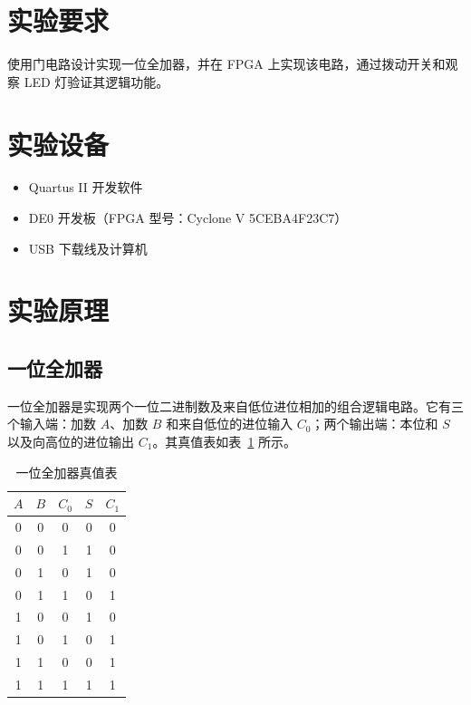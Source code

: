\documentclass{ctexrep}
\begin{document}
\section{实验要求}

使用门电路设计实现一位全加器，并在 FPGA 上实现该电路，通过拨动开关和观察 LED 灯验证其逻辑功能。

\section{实验设备}

\begin{itemize}
    \item Quartus II 开发软件
    \item DE0 开发板（FPGA 型号：Cyclone V 5CEBA4F23C7）
    \item USB 下载线及计算机
\end{itemize}

\section{实验原理}

\subsection{一位全加器}

一位全加器是实现两个一位二进制数及来自低位进位相加的组合逻辑电路。它有三个输入端：加数 $A$、加数 $B$ 和来自低位的进位输入 $C_0$；两个输出端：本位和 $S$ 以及向高位的进位输出 $C_1$。其真值表如表~\ref{e1:tab:truth_table} 所示。

\begin{table}[H]
    \centering
    \caption{一位全加器真值表}
    \label{e1:tab:truth_table}
    \begin{tabular}{ccc|cc}
        \toprule
        $A$ & $B$ & $C_0$ & $S$ & $C_1$ \\
        \midrule
        0 & 0 & 0 & 0 & 0 \\
        0 & 0 & 1 & 1 & 0 \\
        0 & 1 & 0 & 1 & 0 \\
        0 & 1 & 1 & 0 & 1 \\
        1 & 0 & 0 & 1 & 0 \\
        1 & 0 & 1 & 0 & 1 \\
        1 & 1 & 0 & 0 & 1 \\
        1 & 1 & 1 & 1 & 1 \\
        \bottomrule
    \end{tabular}
\end{table}
\end{document}
